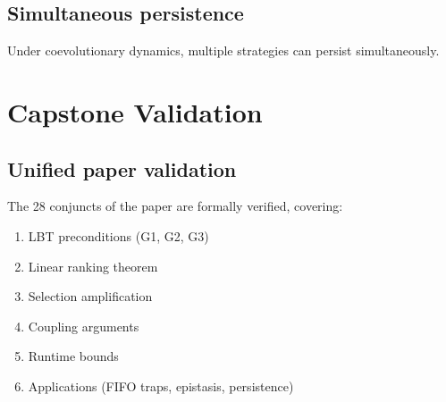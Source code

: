 \section{Simultaneous persistence}
\begin{theorem}
  \label{thm:simultaneous_persistence}
  Under coevolutionary dynamics, multiple strategies can persist simultaneously.
  \leanok
\end{theorem}

\chapter{Capstone Validation}

\section{Unified paper validation}
\begin{theorem}
  \label{thm:full_paper_capstone}
  The 28 conjuncts of the paper are formally verified, covering:
  \begin{enumerate}
    \item LBT preconditions (G1, G2, G3)
    \item Linear ranking theorem
    \item Selection amplification
    \item Coupling arguments
    \item Runtime bounds
    \item Applications (FIFO traps, epistasis, persistence)
  \end{enumerate}
  \leanok
\end{theorem}
